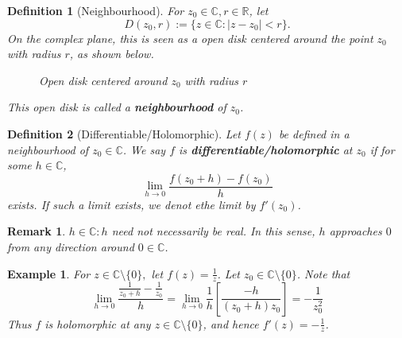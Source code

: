 \documentclass[11pt, oneside]{book}
\theoremstyle{break}
\newtheorem*{remark}{Remark}
\newtheorem{defn}{Definition}[section]
\newtheorem{eg}{Example}[section]
\DeclareMathOperator{\re}{Re}
\DeclareMathOperator{\im}{Im}
\newcommand{\abs}[1]{\left|#1\right|}						%
\begin{document}
\begin{defn}[Neighbourhood]\label{defn:Neighbourhood}
	For $z_0 \in \mathbb{C}, r \in \mathbb{R}$, let
	\begin{equation}\label{eq:neighbourhood_set}
		D(z_0, r) := \{ z \in \mathbb{C} : \abs{z - z_0} < r \}.
	\end{equation}
	On the complex plane, this is seen as a open disk centered around the point $z_0$ with radius $r$, as shown below.
	\begin{figure}[H]
		\begin{center}
		\end{center}
		\caption[loftitle]{Open disk centered around $z_0$ with radius $r$}
		\label{figure:neighbourhood_open_disk}
	\end{figure}
	This open disk is called a \textbf{neighbourhood} of $z_0$.
\end{defn}

\begin{defn}[Differentiable/Holomorphic]\label{defn:Differentiable/Holomorphic}
	Let $f(z)$ be defined in a neighbourhood of $z_0 \in \mathbb{C}$. We say $f$ is \textbf{differentiable/holomorphic} at $z_0$ if for some $h \in \mathbb{C}$,
	\begin{equation}\label{eq:holomorphic}
		\lim_{h \to 0} \frac{f(z_0 + h) - f(z_0)}{h} 
	\end{equation}
	exists. If such a limit exists, we denot ethe limit by $f'(z_0)$.
\end{defn}

\begin{remark}
	$h \in \mathbb{C}: h$ need not necessarily be real. In this sense, $h$ approaches $0$ from any direction around $0 \in \mathbb{C}$.
\end{remark}

\begin{eg}
	For $z \in \mathbb{C} \setminus \{0\},$ let $f(z) = \frac{1}{z}$. Let $z_0 \in \mathbb{C} \setminus \{0\}$. Note that
	\begin{equation*}
		\lim_{h \to 0} \frac{\frac{1}{z_0 + h} - \frac{1}{z_0}}{h} = \lim_{h \to 0} \frac{1}{h} \left[ \frac{-h}{(z_0 + h)z_0} \right] = -\frac{1}{z_0^2} 
	\end{equation*}
	Thus $f$ is holomorphic at any $z \in \mathbb{C} \setminus \{0\}$, and hence $f'(z) = -\frac{1}{z}$.
\end{eg}
\end{document}
